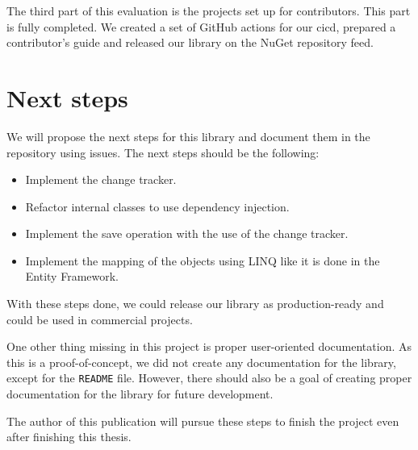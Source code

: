 The third part of this evaluation is the projects set up for contributors.
This part is fully completed. We created a set of GitHub actions for our \acrshort{cicd}, prepared a contributor's guide and released our library on the NuGet repository feed.

\section{Next steps}

We will propose the next steps for this library and document them in the repository using issues. The next steps should be the following:
\begin{itemize}
    \item {Implement the change tracker.}
    \item {Refactor internal classes to use dependency injection.}
    \item {Implement the save operation with the use of the change tracker.}
    \item {Implement the mapping of the objects using LINQ like it is done in the Entity Framework.}
\end{itemize}
With these steps done, we could release our library as production-ready and could be used in commercial projects.

One other thing missing in this project is proper user-oriented documentation.
As this is a proof-of-concept, we did not create any documentation for the library, except for the \texttt{README} file.
However, there should also be a goal of creating proper documentation for the library for future development.

The author of this publication will pursue these steps to finish the project even after finishing this thesis.
